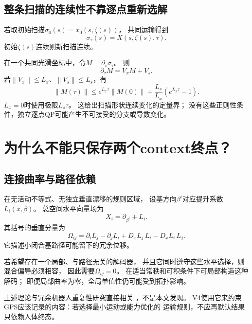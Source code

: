 \documentclass[UTF8,11pt,a4paper,fontset=fandol]{ctexart}
\numberwithin{equation}{section}
\theoremstyle{definition}
\newcommand{\norm}[1]{\left\lVert#1\right\rVert}
\begin{document}
\subsection{整条扫描的连续性不靠逐点重新选解}

若取初始扫描$\sigma_0(s)=x_0(s,\zeta(s))$，
共同运输得到
\begin{equation}
 \sigma_\tau(s)=X(s,\zeta(s),\tau).
\end{equation}
初始$\zeta(s)$连续则新扫描连续。

在一个共同光滑坐标中，令$M=\partial_s\sigma_\tau$。
则
\begin{equation}
 \partial_\tau M
 =
 V_xM+V_s.
\end{equation}
若$\norm{V_x}\leq L_x$、$\norm{V_s}\leq L_s$，有
\begin{equation}
 \boxed{
 \norm{M(\tau)}
 \leq e^{L_x\tau}\norm{M(0)}
 +\frac{L_s}{L_x}(e^{L_x\tau}-1).
 }
 \label{eq:sectionbound}
\end{equation}
$L_x=0$时使用极限$L_s\tau$。
这给出扫描形状连续变化的定量界；
没有这些正则性条件，独立逐点QP可能产生不可接受的分支或导数变化。

\section{为什么不能只保存两个context终点？}

\subsection{连接曲率与路径依赖}

在无活动不等式、无独立垂直漂移的规则区域，
设基方向$\beta^i$对应提升系数$L_i(x,\beta)$。
总空间水平向量场为
\begin{equation}
 X_i=\partial_{\beta^i}+L_i.
\end{equation}
其括号的垂直分量为
\begin{equation}
 \boxed{
 \Omega_{ij}
 =
 \partial_iL_j-\partial_jL_i
 +D_xL_j\,L_i-D_xL_i\,L_j.
 }
 \label{eq:curvature}
\end{equation}
它描述小闭合基路径可能留下的冗余位移。

若希望存在一个局部、与路径无关的解码器，
并且它同时遵守这些水平选择，则混合偏导必须相容，
因此需要$\Omega_{ij}=0$。
在适当常秩和可积条件下可局部构造这种解码；
即便局部曲率为零，全局单值性仍可能受到拓扑影响。

上述理论与冗余机器人重复性研究直接相关
\cite{shamir,tchon}，不是本文发现。
V4使用它来约束GPS应该记录的内容：若选择最小运动或能力优化的
运输规则，不应再默认结果只依赖人体终态。
\end{document}
